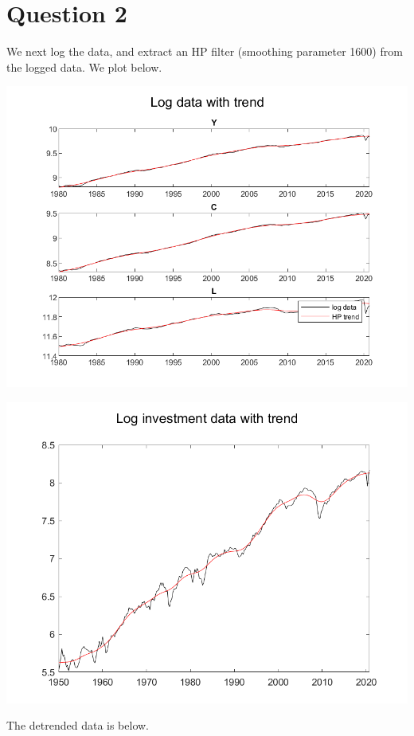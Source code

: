 \documentclass[11pt]{article} %
\begin{document}
\section{Question 2}

We next log the data, and extract an HP filter (smoothing parameter 1600) from the logged data. We plot below.

\includegraphics{log}

\includegraphics{logi}

The detrended data is below.
\end{document}
